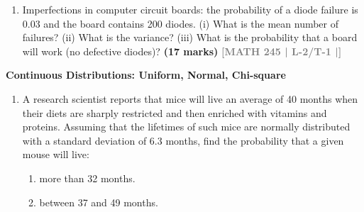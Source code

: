 \documentclass[12pt,a4paper]{article}
\newcommand{\yr}[1]{\hfill\textcolor{gray}{\small\textbf{[#1]}}}
\newcommand{\mk}[1]{\textcolor{orange!70!black}{\small\textbf{(#1 marks)}}}
\newcommand{\subtopic}[2]{%
  \vspace{10pt}
  \noindent\begin{tcolorbox}[colback=#1!8,colframe=#1,boxrule=0.6pt,arc=4pt,
    left=6pt,right=6pt,top=4pt,bottom=4pt]
    \small\bfseries\textcolor{#1}{#2}
  \end{tcolorbox}
  \vspace{2pt}
}
\begin{document}
\begin{enumerate}
\item Imperfections in computer circuit boards: the probability of a diode failure is 0.03 and the board contains 200 diodes. (i) What is the mean number of failures? (ii) What is the variance? (iii) What is the probability that a board will work (no defective diodes)?
\mk{17} \yr{MATH 245 | L-2/T-1 |}

\end{enumerate}

\subtopic{cG}{Continuous Distributions: Uniform, Normal, Chi-square}

\label{sub:s8-continuous}

\begin{enumerate}

\item A research scientist reports that mice will live an average of 40 months when their diets are sharply restricted and then enriched with vitamins and proteins. Assuming that the lifetimes of such mice are normally distributed with a standard deviation of $6.3$ months, find the probability that a given mouse will live:
\begin{enumerate}
  \item more than 32 months.
  \item between 37 and 49 months.
\end{enumerate}


\begin{center}
\end{center}


\end{enumerate}
\end{document}
